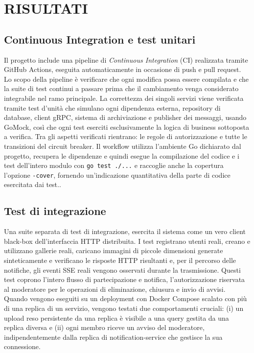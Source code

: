 \documentclass[conference]{IEEEtran}
\begin{document}
\section{RISULTATI}
\subsection{Continuous Integration e test unitari}
Il progetto include una pipeline di \textit{Continuous Integration} (CI) realizzata tramite GitHub Actions, eseguita automaticamente in occasione di push e pull request. Lo scopo della pipeline è verificare che ogni modifica possa essere compilata e che la suite di test continui a passare prima che il cambiamento venga considerato integrabile nel ramo principale. La correttezza dei singoli servizi viene verificata tramite test d'unità che simulano ogni dipendenza esterna, repository di database, client gRPC, sistema di archiviazione e publisher dei messaggi, usando GoMock, così che ogni test eserciti esclusivamente la logica di business sottoposta a verifica. Tra gli aspetti verificati rientrano: le regole di autorizzazione e tutte le transizioni del circuit breaker. Il workflow utilizza l'ambiente Go dichiarato dal progetto, recupera le dipendenze e quindi esegue la compilazione del codice e i test dell'intero modulo con \texttt{go test ./...} e raccoglie anche la copertura l'opzione \texttt{-cover}, fornendo un'indicazione quantitativa della parte di codice esercitata dai test.\cite{b17}.
\subsection{Test di integrazione}
Una suite separata di test di integrazione, esercita il sistema come un vero client black-box dell'interfaccia HTTP distribuita. I test registrano utenti reali, creano e utilizzano gallerie reali, caricano immagini di piccole dimensioni generate sinteticamente e verificano le risposte HTTP risultanti e, per il percorso delle notifiche, gli eventi SSE reali vengono osservati durante la trasmissione. Questi test coprono l'intero flusso di partecipazione e notifica, l'autorizzazione riservata al moderatore per le operazioni di eliminazione, chiusura e invio di avvisi. Quando vengono eseguiti su un deployment con Docker Compose scalato con più di una replica di un servizio, vengono testati due comportamenti cruciali: (i) un upload reso persistente da una replica è visibile a una query gestita da una replica diversa e (ii) ogni membro riceve un avviso del moderatore, indipendentemente dalla replica di notification-service che gestisce la sua connessione.
\end{document}
